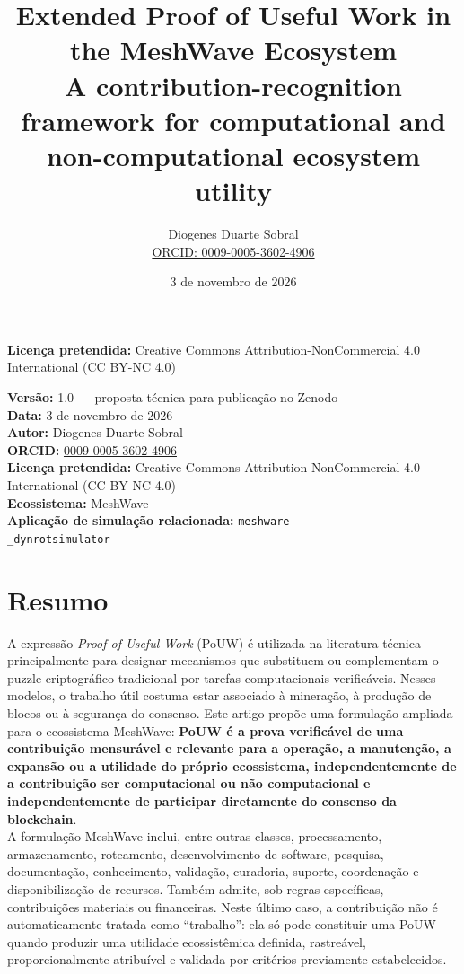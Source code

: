 \documentclass[12pt,a4paper]{article}
\title{Extended Proof of Useful Work in the MeshWave Ecosystem\\\large A contribution-recognition framework for computational and non-computational ecosystem utility}
\author{Diogenes Duarte Sobral\\\href{https://orcid.org/0009-0005-3602-4906}{ORCID: 0009-0005-3602-4906}}
\date{3 de novembro de 2026}
\begin{document}
\maketitle
\begin{center}\textbf{Licença pretendida:} Creative Commons Attribution-NonCommercial 4.0 International (CC BY-NC 4.0)\end{center}
\vspace{1em}


\textbf{Versão:} 1.0 — proposta técnica para publicação no Zenodo  \\
\textbf{Data:} 3 de novembro de 2026  \\
\textbf{Autor:} Diogenes Duarte Sobral  \\
\textbf{ORCID:} \href{https://orcid.org/0009-0005-3602-4906}{0009-0005-3602-4906}  \\
\textbf{Licença pretendida:} Creative Commons Attribution-NonCommercial 4.0 International (CC BY-NC 4.0)  \\
\textbf{Ecossistema:} MeshWave  \\
\textbf{Aplicação de simulação relacionada:} \texttt{meshware\\_dynrotsimulator}\\


\section{Resumo}

A expressão \emph{Proof of Useful Work} (PoUW) é utilizada na literatura técnica principalmente para designar mecanismos que substituem ou complementam o puzzle criptográfico tradicional por tarefas computacionais verificáveis. Nesses modelos, o trabalho útil costuma estar associado à mineração, à produção de blocos ou à segurança do consenso. Este artigo propõe uma formulação ampliada para o ecossistema MeshWave: \textbf{PoUW é a prova verificável de uma contribuição mensurável e relevante para a operação, a manutenção, a expansão ou a utilidade do próprio ecossistema, independentemente de a contribuição ser computacional ou não computacional e independentemente de participar diretamente do consenso da blockchain}.\\

A formulação MeshWave inclui, entre outras classes, processamento, armazenamento, roteamento, desenvolvimento de software, pesquisa, documentação, conhecimento, validação, curadoria, suporte, coordenação e disponibilização de recursos. Também admite, sob regras específicas, contribuições materiais ou financeiras. Neste último caso, a contribuição não é automaticamente tratada como “trabalho”: ela só pode constituir uma PoUW quando produzir uma utilidade ecossistêmica definida, rastreável, proporcionalmente atribuível e validada por critérios previamente estabelecidos.\\
\end{document}
